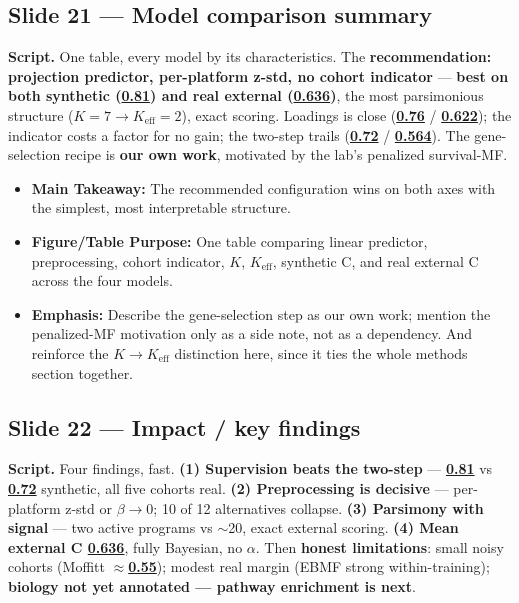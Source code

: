 \documentclass[11pt]{article}
\newcommand{\scriptlabel}{\textbf{Script. }}
\newcommand{\sectionlabel}[1]{\textbf{#1}}
\newcommand{\key}[1]{\textcolor{keyblue}{\textbf{#1}}}        %
\newcommand{\num}[1]{\textcolor{keycar}{\textbf{\uline{#1}}}} %
\begin{document}
\subsection*{Slide 21 --- Model comparison summary}
\scriptlabel One table, every model by its characteristics. The \key{recommendation: projection
predictor, per-platform z-std, no cohort indicator} --- \key{best on both synthetic (\num{0.81}) and
real external (\num{0.636})}, the most parsimonious structure ($K = 7 \to K_{\text{eff}} = 2$), exact
scoring. Loadings is close (\num{0.76} / \num{0.622}); the indicator costs a factor for no gain; the
two-step trails (\num{0.72} / \num{0.564}). The gene-selection recipe is \key{our own work},
motivated by the lab's penalized survival-MF.

\begin{itemize}
\item \sectionlabel{Main Takeaway:} The recommended configuration wins on both axes with the
simplest, most interpretable structure.
\item \sectionlabel{Figure/Table Purpose:} One table comparing linear predictor, preprocessing,
cohort indicator, $K$, $K_{\text{eff}}$, synthetic C, and real external C across the four models.
\item \sectionlabel{Emphasis:} Describe the gene-selection step as our own work; mention the
penalized-MF motivation only as a side note, not as a dependency. And reinforce the $K \to
K_{\text{eff}}$ distinction here, since it ties the whole methods section together.
\end{itemize}

\subsection*{Slide 22 --- Impact / key findings}
\scriptlabel Four findings, fast. \key{(1) Supervision beats the two-step} --- \num{0.81} vs
\num{0.72} synthetic, all five cohorts real. \key{(2) Preprocessing is decisive} --- per-platform
z-std or $\beta \to 0$; 10 of 12 alternatives collapse. \key{(3) Parsimony with signal} --- two
active programs vs $\sim$20, exact external scoring. \key{(4) Mean external C \num{0.636}}, fully
Bayesian, no $\alpha$. Then \key{honest limitations}: small noisy cohorts (Moffitt $\approx$\num{0.55});
modest real margin (EBMF strong within-training); \key{biology not yet annotated --- pathway
enrichment is next}.
\end{document}
